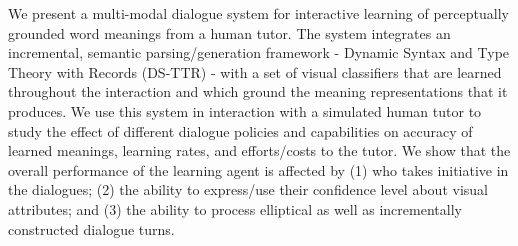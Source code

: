 We present a multi-modal dialogue system for interactive learning of perceptually grounded word meanings from a human tutor. The system integrates an incremental, semantic parsing/generation framework - Dynamic Syntax and Type Theory with Records (DS-TTR) - with a set of visual classifiers that are learned throughout the interaction and which ground the meaning representations that it produces. We use this system in interaction with a simulated human tutor to study the effect of different dialogue policies and capabilities on accuracy of learned meanings, learning rates, and efforts/costs to the tutor. We show that the overall performance of the learning agent is affected by (1) who takes initiative in the dialogues; (2) the ability to express/use their confidence level about visual attributes; and (3) the ability to process elliptical as well as incrementally constructed dialogue turns.
